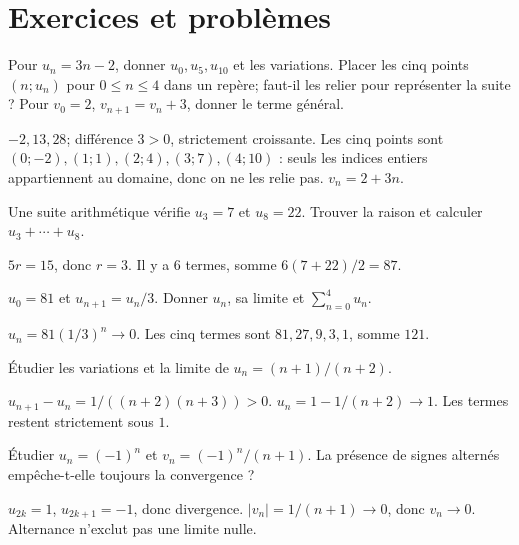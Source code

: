 \section{Exercices et problèmes}
\exo[Générer]\label{t11s-c12-e01}
Pour $u_n=3n-2$, donner $u_0,u_5,u_{10}$ et les variations. Placer les cinq points $(n;u_n)$ pour $0\le n\le4$ dans un repère; faut-il les relier pour représenter la suite ? Pour $v_0=2$, $v_{n+1}=v_n+3$, donner le terme général.
\begin{corrige}\label{sol-t11s-c12-e01}
$-2,13,28$; différence $3>0$, strictement croissante. Les cinq points sont $(0;-2),(1;1),(2;4),(3;7),(4;10)$ : seuls les indices entiers appartiennent au domaine, donc on ne les relie pas. $v_n=2+3n$.
\begin{center}\end{center}
\end{corrige}
\label{t11s-c12-e02}
Une suite arithmétique vérifie $u_3=7$ et $u_8=22$. Trouver la raison et calculer $u_3+\cdots+u_8$.
\begin{corrige}\label{sol-t11s-c12-e02}
$5r=15$, donc $r=3$. Il y a $6$ termes, somme $6(7+22)/2=87$.
\end{corrige}
\label{t11s-c12-e03}
$u_0=81$ et $u_{n+1}=u_n/3$. Donner $u_n$, sa limite et $\sum_{n=0}^{4}u_n$.
\begin{corrige}\label{sol-t11s-c12-e03}
$u_n=81(1/3)^n\to0$. Les cinq termes sont $81,27,9,3,1$, somme $121$.
\end{corrige}
\label{t11s-c12-e04}
Étudier les variations et la limite de $u_n=(n+1)/(n+2)$.
\begin{corrige}\label{sol-t11s-c12-e04}
$u_{n+1}-u_n=1/((n+2)(n+3))>0$. $u_n=1-1/(n+2)\to1$. Les termes restent strictement sous $1$.
\end{corrige}
\exo[Oscillation]\label{t11s-c12-e05}
Étudier $u_n=(-1)^n$ et $v_n=(-1)^n/(n+1)$. La présence de signes alternés empêche-t-elle toujours la convergence ?
\begin{corrige}\label{sol-t11s-c12-e05}
$u_{2k}=1$, $u_{2k+1}=-1$, donc divergence. $|v_n|=1/(n+1)\to0$, donc $v_n\to0$. Alternance n’exclut pas une limite nulle.
\end{corrige}
